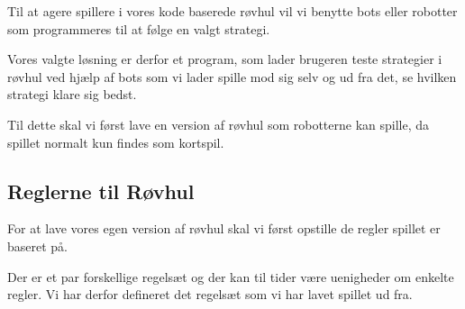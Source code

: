 \documentclass[a4paper, 12pt]{article}
\begin{document}
Til at agere spillere i vores kode baserede røvhul vil vi benytte bots eller robotter som programmeres til at følge en valgt strategi.

Vores valgte løsning er derfor et program, som lader brugeren teste strategier i røvhul ved hjælp af bots som vi lader spille mod sig selv og ud fra det, se hvilken strategi klare sig bedst.

Til dette skal vi først lave en version af røvhul som robotterne kan spille, da spillet normalt kun findes som kortspil. 

\subsection{Reglerne til Røvhul}
For at lave vores egen version af røvhul skal vi først opstille de regler spillet er baseret på.

Der er et par forskellige regelsæt og der kan til tider være uenigheder om enkelte regler. Vi har derfor defineret det regelsæt som vi har lavet spillet ud fra.
\end{document}
